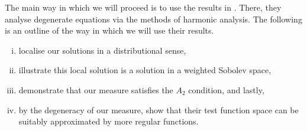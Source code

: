 \documentclass[a4paper, 12pt]{amsart}
\begin{document}
The main way in which we will proceed is to use the
results in \cite{CS}. There, they analyse
degenerate equations via the methods of harmonic analysis.
The following is an outline of the way in which we will use
their results.
\begin{enumerate}[(i)]
\item localise our solutions in a distributional sense, 
\item illustrate this local solution is a solution in a weighted Sobolev space,
\item demonstrate that our measure satisfies the $A_2$ condition, and lastly,
\item by the degeneracy of our measure, show that their test function
	space can be suitably approximated by more regular functions. 
\end{enumerate}



\printbibliography
\end{document}
